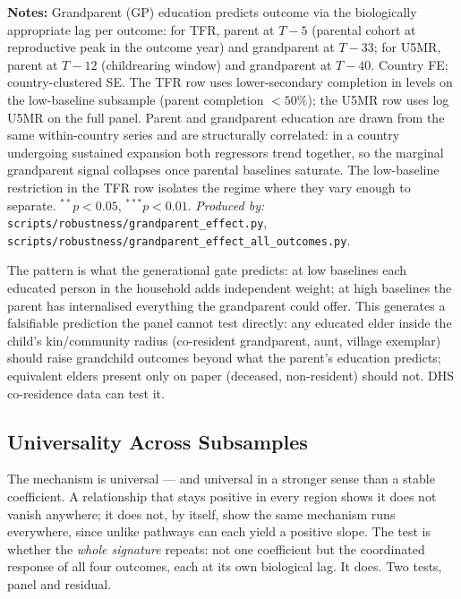 \documentclass[12pt,letterpaper]{article}
\begin{document}
\begin{minipage}{\dimexpr\textwidth-2em}
\scriptsize
\textbf{Notes:} Grandparent (GP) education predicts outcome via the
biologically appropriate lag per outcome: for TFR, parent at $T-5$
(parental cohort at reproductive peak in the outcome year) and
grandparent at $T-33$; for U5MR, parent at $T-12$ (childrearing
window) and grandparent at $T-40$. Country FE; country-clustered
SE. The TFR row uses lower-secondary completion in levels on the
low-baseline subsample (parent completion $<50\%$); the U5MR row uses
log U5MR on the full panel. Parent and grandparent
education are drawn from the same within-country series and are
structurally correlated: in a country undergoing sustained expansion
both regressors trend together, so the marginal grandparent signal
collapses once parental baselines saturate. The low-baseline
restriction in the TFR row isolates the regime where they vary enough
to separate.
$^{**}p<0.05$, $^{***}p<0.01$.
\textit{Produced by:} \texttt{scripts/robustness/grandparent\_effect.py},
\texttt{scripts/robustness/grandparent\_effect\_all\_outcomes.py}.
\end{minipage}

The pattern is what the
generational gate predicts: at low baselines each educated person in
the household adds independent weight; at high baselines the parent
has internalised everything the grandparent could offer. This
generates a falsifiable prediction the panel cannot test directly: any
educated elder inside the child's kin/community radius (co-resident
grandparent, aunt, village exemplar) should raise grandchild outcomes
beyond what the parent's education predicts; equivalent elders
present only on paper (deceased, non-resident) should not. DHS
co-residence data can test it.

\subsection{Universality Across Subsamples}\label{universality-across-subsamples}

The mechanism is universal --- and universal in a stronger sense than a
stable coefficient. A relationship that stays positive in every region
shows it does not vanish anywhere; it does not, by itself, show the same
mechanism runs everywhere, since unlike pathways can each yield a
positive slope. The test is whether the \emph{whole signature} repeats:
not one coefficient but the coordinated response of all four outcomes,
each at its own biological lag. It does. Two tests, panel and residual.
\end{document}

